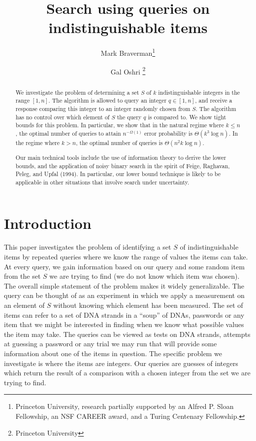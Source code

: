 \documentclass[12pt]{article}
\newcommand{\Ta}{\Theta}
\begin{document}
\title{Search using queries on indistinguishable items}

\author{Mark Braverman\thanks{Princeton University, research partially supported by an Alfred P. Sloan Fellowship, an NSF CAREER award, and a Turing Centenary Fellowship. }\and
Gal Oshri \thanks{Princeton University}}


\maketitle


\begin{abstract}
We investigate the problem of determining a set $S$ of $k$ indistinguishable integers in the range $[1, n]$. 
The algorithm is allowed to query an integer $q\in [1,n]$, and receive a response comparing this integer to an integer randomly chosen from $S$. 
The algorithm has no control over which element of $S$ the query $q$ is compared to. 
We show tight bounds for this problem. In particular, we show that in the natural regime where $k\le n$, the optimal number of queries to attain $n^{-\Omega(1)}$ error probability is $\Ta(k^3 \log n)$. 
In the regime where $k>n$, the optimal number of queries is $\Ta(n^2 k \log n)$. 

Our main technical tools include the use of information theory to derive the lower bounds, and the application of noisy binary search 
in the spirit of Feige, Raghavan, Peleg, and Upfal (1994). In particular, our lower bound technique is likely to be applicable in other 
situations that involve search under uncertainty. 
\end{abstract}

\newpage

\setcounter{page}{1}



\section{Introduction}
This paper investigates the problem of identifying a set $S$ of indistinguishable items by repeated queries where we know the range of values the items can take. At every query, we gain information based on our query and some random item from the set $S$ we are trying to find (we do not know which item was chosen). The overall simple statement of the problem makes it widely generalizable. The query can be thought of as an experiment in which we apply a measurement on an element of $S$ without knowing which element has been measured. The set of items can refer to a set of DNA strands in a ``soup'' of DNAs, passwords or any item that we might be interested in finding when we know what possible values the item may take. The queries can be viewed as tests on DNA strands, attempts at guessing a password or any trial we may run that will provide some information about one of the items in question. The specific problem we investigate is where the items are integers. Our queries are guesses of integers which return the result of a comparison with a chosen integer from the set we are trying to find.
\end{document}
